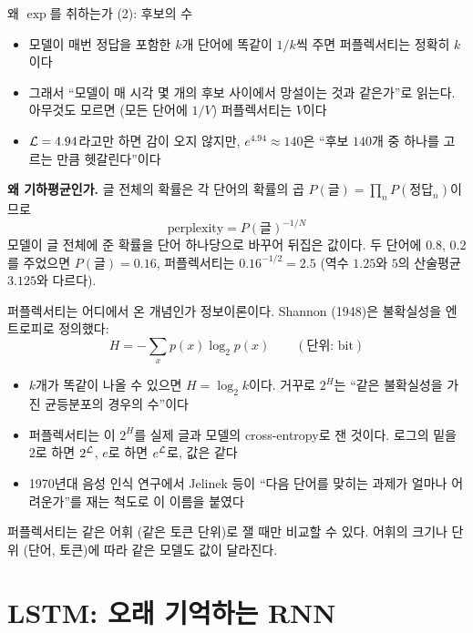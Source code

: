 \documentclass[aspectratio=169,11pt]{beamer}
\begin{document}
\begin{frame}{왜 $\exp$를 취하는가 (2): 후보의 수}
\begin{itemize}
\item 모델이 매번 정답을 포함한 $k$개 단어에 똑같이 $1/k$씩 주면 퍼플렉서티는 정확히 $k$이다
\item 그래서 ``모델이 매 시각 몇 개의 후보 사이에서 망설이는 것과 같은가''로 읽는다.
아무것도 모르면 (모든 단어에 $1/V$) 퍼플렉서티는 $V$이다
\item $\mathcal{L}=4.94$라고만 하면 감이 오지 않지만, $e^{4.94}\approx140$은
``후보 $140$개 중 하나를 고르는 만큼 헷갈린다''이다
\end{itemize}
\vskip2mm
\textbf{왜 기하평균인가.} 글 전체의 확률은 각 단어의 확률의 곱
$P(\text{글})=\prod_nP(\text{정답}_n)$이므로
\[
\text{perplexity}=P(\text{글})^{-1/N}
\]
모델이 글 전체에 준 확률을 단어 하나당으로 바꾸어 뒤집은 값이다.
두 단어에 $0.8$, $0.2$를 주었으면 $P(\text{글})=0.16$, 퍼플렉서티는 $0.16^{-1/2}=2.5$
(역수 $1.25$와 $5$의 산술평균 $3.125$와 다르다).
\end{frame}

\begin{frame}{퍼플렉서티는 어디에서 온 개념인가}
정보이론이다. Shannon (1948)은 불확실성을 엔트로피로 정의했다:
\[
H=-\sum_xp(x)\log_2p(x)\qquad(\text{단위: bit})
\]
\begin{itemize}
\item $k$개가 똑같이 나올 수 있으면 $H=\log_2k$이다.
거꾸로 $2^H$는 ``같은 불확실성을 가진 균등분포의 경우의 수''이다
\item 퍼플렉서티는 이 $2^H$를 실제 글과 모델의 cross-entropy로 잰 것이다.
로그의 밑을 $2$로 하면 $2^{\mathcal{L}}$, $e$로 하면 $e^{\mathcal{L}}$로, 값은 같다
\item 1970년대 음성 인식 연구에서 Jelinek 등이
``다음 단어를 맞히는 과제가 얼마나 어려운가''를 재는 척도로 이 이름을 붙였다
\end{itemize}
\vskip1mm
\begin{remarkbox}
퍼플렉서티는 같은 어휘 (같은 토큰 단위)로 잴 때만 비교할 수 있다.
어휘의 크기나 단위 (단어, 토큰)에 따라 같은 모델도 값이 달라진다.
\end{remarkbox}
\end{frame}

\section{LSTM: 오래 기억하는 RNN}
\end{document}
